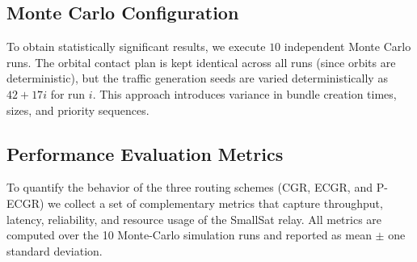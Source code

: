 \documentclass[a4paper,fleqn]{cas-dc}
\newcommand{\ecgr}{\textsf{ECGR}}
\newcommand{\cgr}{\textsf{CGR}}
\newcommand{\pecgr}{\textsf{P-ECGR}}
\begin{document}
\subsection{Monte Carlo Configuration}
To obtain statistically significant results, we execute $10$ independent Monte Carlo runs. The orbital contact plan is kept identical across all runs (since orbits are deterministic), but the traffic generation seeds are varied deterministically as $42 + 17i$ for run $i$. This approach introduces variance in bundle creation times, sizes, and priority sequences.

\subsection{Performance Evaluation Metrics}
\label{sec:metrics}
To quantify the behavior of the three routing schemes (\cgr{}, \ecgr{}, and \pecgr{}) we collect a set of complementary metrics that capture throughput, latency, reliability, and resource usage of the SmallSat relay. All metrics are computed over the 10 Monte-Carlo simulation runs and reported as mean $\pm$ one standard deviation.
\end{document}
